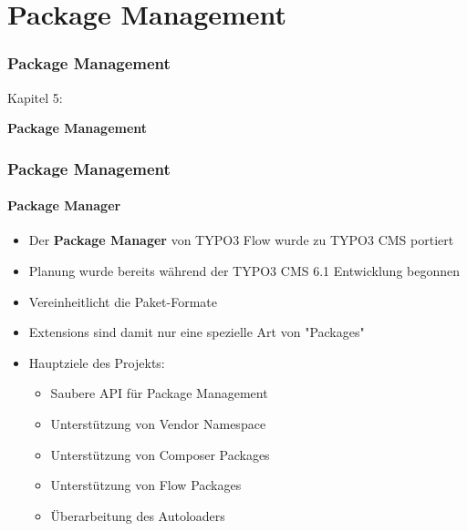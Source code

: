 %

\section{Package Management}
\begin{frame}[fragile]
	\frametitle{Package Management}

	\begin{center}\huge{Kapitel 5:}\end{center}
	\begin{center}\huge{\color{typo3darkgrey}\textbf{Package Management}}\end{center}

\end{frame}


\begin{frame}[fragile]
	\frametitle{Package Management}
	\framesubtitle{Package Manager}

	\begin{itemize}
		\item Der \textbf{Package Manager} von TYPO3 Flow wurde zu TYPO3 CMS portiert
		\item Planung wurde bereits während der TYPO3 CMS 6.1 Entwicklung begonnen
		\item Vereinheitlicht die Paket-Formate
		\item Extensions sind damit nur eine spezielle Art von "Packages"
		\item Hauptziele des Projekts:

			\begin{itemize}
				\item Saubere API für Package Management
				\item Unterstützung von Vendor Namespace
				\item Unterstützung von Composer Packages
				\item Unterstützung von Flow Packages
				\item Überarbeitung des Autoloaders
			\end{itemize}

	\end{itemize}

\end{frame}

